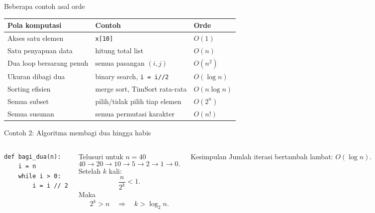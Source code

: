 \documentclass[aspectratio=169,11pt]{beamer}
\begin{document}
\begin{frame}{Beberapa contoh asal orde}
\begin{table}\small
\begin{tabular}{p{}p{}p{}}
\toprule
Pola komputasi & Contoh & Orde\\
\midrule
Akses satu elemen & \texttt{x[10]} & $O(1)$\\
Satu penyapuan data & hitung total list & $O(n)$\\
Dua loop bersarang penuh & semua pasangan $(i,j)$ & $O(n^2)$\\
Ukuran dibagi dua & binary search, \texttt{i = i//2} & $O(\log n)$\\
Sorting efisien & merge sort, TimSort rata-rata & $O(n\log n)$\\
Semua subset & pilih/tidak pilih tiap elemen & $O(2^n)$\\
Semua susunan & semua permutasi karakter & $O(n!)$\\
\bottomrule
\end{tabular}
\end{table}
\end{frame}

\begin{frame}[fragile]{Contoh 2: Algoritma membagi dua hingga habis}
\vspace{-0.2cm}
\begin{columns}[T]
\begin{lstlisting}
def bagi_dua(n):
    i = n
    while i > 0:
        i = i // 2
\end{lstlisting}
\begin{block}{Telusuri untuk $n=40$}
\[
40 \to 20 \to 10 \to 5 \to 2 \to 1 \to 0.
\]
\pause
Setelah $k$ kali:
\[
\frac{n}{2^k} < 1.
\]
Maka
\[
2^k > n \quad \Rightarrow \quad k > \log_2 n.
\]
\end{block}
\pause
\vspace{-0.3cm}
\begin{alertblock}{Kesimpulan}
Jumlah iterasi bertambah lambat: $O(\log n)$.
\end{alertblock}
\end{columns}
\end{frame}
\end{document}
